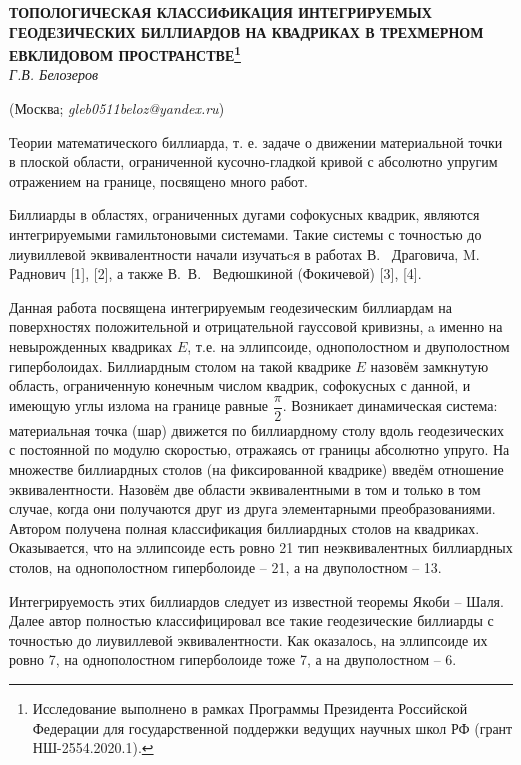 \begin{center}
    {\bf ТОПОЛОГИЧЕСКАЯ КЛАССИФИКАЦИЯ ИНТЕГРИРУЕМЫХ ГЕОДЕЗИЧЕСКИХ БИЛЛИАРДОВ НА КВАДРИКАХ В ТРЕХМЕРНОМ ЕВКЛИДОВОМ ПРОСТРАНСТВЕ\footnote{Исследование выполнено в рамках Программы Президента Российской Федерации для государственной поддержки ведущих научных школ РФ (грант НШ-2554.2020.1).}}\\

    {\it Г.В. Белозеров}

    (Москва; {\it gleb0511beloz@yandex.ru})
\end{center}


Теории математического биллиарда, т. е. задаче о движении материальной
точки в плоской области, ограниченной кусочно-гладкой кривой с абсолютно
упругим отражением на границе, посвящено много работ.

Биллиарды в областях, ограниченных дугами софокусных квадрик, являются интегрируемыми гамильтоновыми системами.
Такие системы с точностью до лиувиллевой эквивалентности начали изучатьcя
в работах В.~ Драговича, M.~ Раднович [1], [2], а также В.\, В.~ Ведюшкиной (Фокичевой) [3], [4].

Данная работа посвящена интегрируемым геодезическим биллиардам на поверхностях положительной и отрицательной гауссовой
кривизны, a именно на невырожденных квадриках $E$, т.е. на эллипсоиде, однополостном и двуполостном гиперболоидах.
Биллиардным столом на такой квадрике $E$ назовём замкнутую область,
ограниченную конечным числом квадрик, софокусных с данной, и имеющую углы излома на границе равные
$\dfrac{\pi}{2}$. Возникает динамическая система:
материальная точка (шар) движется по биллиардному столу
вдоль геодезических с постоянной по модулю скоростью, отражаясь от границы абсолютно упруго. На
множестве биллиардных столов (на фиксированной квадрике) введём отношение эквивалентности.
Назовём две области эквивалентными
в том и только в том случае, когда они получаются друг из друга элементарными преобразованиями.
Автором получена полная классификация биллиардных столов на квадриках. Оказывается, что
на эллипсоиде есть ровно 21 тип неэквивалентных биллиардных столов, на однополостном гиперболоиде -- 21, а на двуполостном -- 13.


Интегрируемость этих биллиардов следует из известной теоремы Якоби -- Шаля.
Далее автор полностью классифицировал все такие геодезические биллиарды с
точностью до лиувиллевой эквивалентности. Как оказалось, на эллипсоиде их ровно 7, на однополостном гиперболоиде тоже 7, а на двуполостном -- 6.

